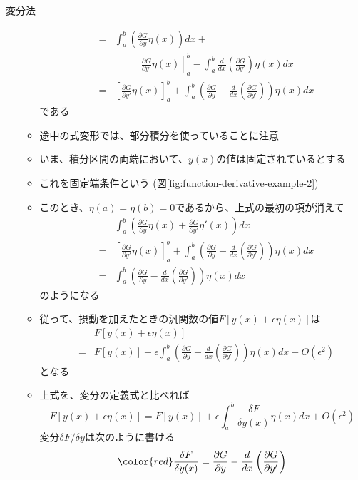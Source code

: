 \documentclass[dvipdfmx,notheorems,t]{beamer}
\begin{document}
\begin{frame}{変分法}
\begin{itemize}
\begin{itemize}
\begin{eqnarray}
			&=& \int_a^b \left( \frac{\partial G}{\partial y} \eta(x) \right) dx + \nonumber \\
			&& \qquad \left[ \frac{\partial G}{\partial y'} \eta(x) \right]_a^b - \int_a^b \frac{d}{dx} \left( \frac{\partial G}{\partial y'} \right) \eta(x) dx \\
			&=& \left[ \frac{\partial G}{\partial y'} \eta(x) \right]_a^b + \int_a^b \left( \frac{\partial G}{\partial y} - \frac{d}{dx} \left( \frac{\partial G}{\partial y'} \right) \right) \eta(x) dx
		\end{eqnarray}
		である
		\newline
		\item 途中の式変形では、部分積分を使っていることに注意
		\newline
		\item いま、積分区間の両端において、$y(x)$の値は固定されているとする
		\item これを\alert{固定端条件}という (図\ref{fig:function-derivative-example-2})
		\newline
		\item このとき、$\eta(a) = \eta(b) = 0$であるから、上式の最初の項が消えて
		\begin{eqnarray}
			&& \int_a^b \left( \frac{\partial G}{\partial y} \eta(x) + \frac{\partial G}{\partial y'} \eta'(x) \right) dx \nonumber \\
			&=& \left[ \frac{\partial G}{\partial y'} \eta(x) \right]_a^b + \int_a^b \left( \frac{\partial G}{\partial y} - \frac{d}{dx} \left( \frac{\partial G}{\partial y'} \right) \right) \eta(x) dx \\
			&=& \int_a^b \left( \frac{\partial G}{\partial y} - \frac{d}{dx} \left( \frac{\partial G}{\partial y'} \right) \right) \eta(x) dx
		\end{eqnarray}
		のようになる
		
		\item 従って、摂動を加えたときの汎関数の値$F[y(x) + \epsilon \eta(x)]$は
		\begin{eqnarray}
			&& F[y(x) + \epsilon \eta(x)] \nonumber \\
			&=& F[y(x)] + \epsilon \int_a^b \left( \frac{\partial G}{\partial y} - \frac{d}{dx} \left( \frac{\partial G}{\partial y'} \right) \right) \eta(x) dx + O(\epsilon^2)
		\end{eqnarray}
		となる
		\newline
		
		\item 上式を、変分の定義式と比べれば
		\begin{equation}
			F[y(x) + \epsilon \eta(x)] = F[y(x)] + \epsilon \int_a^b \frac{\delta F}{\delta y(x)} \eta(x) dx + O(\epsilon^2)
		\end{equation}
		変分$\delta F/\delta y$は次のように書ける
		\begin{equation}
			\color{red}\frac{\delta F}{\delta y(x)} = \frac{\partial G}{\partial y} - \frac{d}{dx} \left( \frac{\partial G}{\partial y'} \right)\normalcolor
		\end{equation}
		

\end{itemize}
\end{itemize}
\end{frame}
\end{document}
